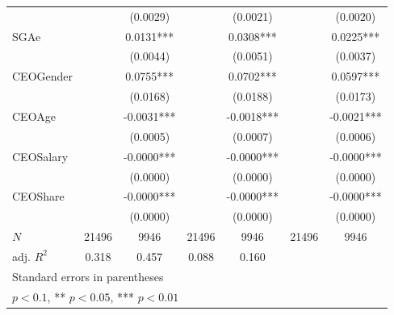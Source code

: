 \begin{table}[htbp]
\begin{tabular}{l*{6}{c}}
            &               &    (0.0029)   &               &    (0.0021)   &               &    (0.0020)   \\
[1em]
SGAe        &               &      0.0131***&               &      0.0308***&               &      0.0225***\\
            &               &    (0.0044)   &               &    (0.0051)   &               &    (0.0037)   \\
[1em]
CEOGender   &               &      0.0755***&               &      0.0702***&               &      0.0597***\\
            &               &    (0.0168)   &               &    (0.0188)   &               &    (0.0173)   \\
[1em]
CEOAge      &               &     -0.0031***&               &     -0.0018***&               &     -0.0021***\\
            &               &    (0.0005)   &               &    (0.0007)   &               &    (0.0006)   \\
[1em]
CEOSalary   &               &     -0.0000***&               &     -0.0000***&               &     -0.0000***\\
            &               &    (0.0000)   &               &    (0.0000)   &               &    (0.0000)   \\
[1em]
CEOShare    &               &     -0.0000***&               &     -0.0000***&               &     -0.0000***\\
            &               &    (0.0000)   &               &    (0.0000)   &               &    (0.0000)   \\
\hline
\(N\)       &       21496   &        9946   &       21496   &        9946   &       21496   &        9946   \\
adj. \(R^{2}\)&       0.318   &       0.457   &       0.088   &       0.160   &               &               \\
\hline\hline
\multicolumn{7}{l}{\footnotesize Standard errors in parentheses}\\
\multicolumn{7}{l}{\footnotesize * \(p<0.1\), ** \(p<0.05\), *** \(p<0.01\)}\\
\end{tabular}
\end{table}
